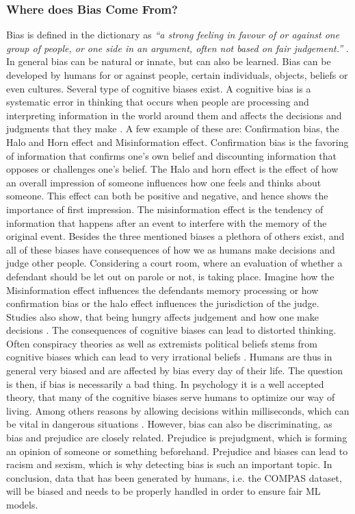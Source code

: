 \documentclass[11pt, fleqn, titlepage]{article}
\begin{document}
	\subsubsection{Where does Bias Come From?}\label{rootofbias}
	Bias is defined in the dictionary as \textit{\enquote{a strong feeling in favour of or against one group of people, or one side in an argument, often not based on fair judgement.}} \cite{oxford}. In general bias can be natural or innate,  but can also be learned. Bias can be developed by humans for or against people, certain individuals, objects, beliefs or even cultures. Several type of cognitive biases exist. A cognitive bias is a systematic error in thinking that occurs when people are processing and interpreting information in the world around them and affects the decisions and judgments that they make \cite{verywellmind}. A few example of these are: Confirmation bias, the Halo and Horn effect and Misinformation effect. Confirmation bias is the favoring of information that confirms one's own belief and discounting information that opposes or challenges one's belief. The Halo and horn effect is the effect of how an overall impression of someone influences how one feels and thinks about someone. This effect can both be positive and negative, and hence shows the importance of first impression. The misinformation effect is the tendency of information that happens after an event to interfere with the memory of the original event. Besides the three mentioned biases a plethora of others exist, and all of these biases have consequences of how we as humans make decisions and judge other people. Considering a court room, where an evaluation of whether a defendant should be let out on parole or not, is taking place. Imagine how the Misinformation effect influences the defendants memory processing or how confirmation bias or the halo effect influences the jurisdiction of the judge. Studies also show, that being hungry affects judgement  and how one make decisions \cite{eat}. \newline \indent
	The consequences of cognitive biases can lead to distorted thinking. Often conspiracy theories as well as extremists political beliefs stems from cognitive biases which can lead to very irrational beliefs \cite{cog_bias}. Humans are thus in general very biased and are affected by bias every day of their life. The question is then, if bias is necessarily a bad thing. In psychology it is a well accepted theory, that many of the cognitive biases serve humans to optimize our way of living. Among others reasons by allowing decisions within milliseconds, which can be vital in dangerous situations \cite{reisberg}. However, bias can also be discriminating, as bias and prejudice are closely related. Prejudice is prejudgment, which is forming an opinion of someone or something beforehand. Prejudice and biases can lead to racism and sexism, which is why detecting bias is such an important topic. In conclusion, data that has been generated by humans, i.e. the COMPAS dataset, will be biased and needs to be properly handled in order to ensure fair ML models.
	
\end{document}
